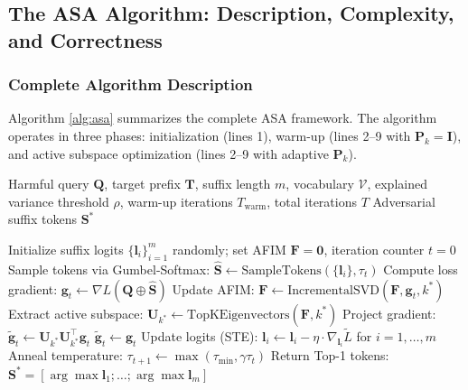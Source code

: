 \documentclass[preprint,12pt]{elsarticle}
\begin{document}
\subsection{The ASA Algorithm: Description, Complexity, and Correctness}
\label{sec:algorithm}

\subsubsection{Complete Algorithm Description}
\label{sec:alg_description}

Algorithm \ref{alg:asa} summarizes the complete ASA framework. The algorithm operates in three phases: initialization (lines 1), warm-up (lines 2--9 with $\mathbf{P}_k = \mathbf{I}$), and active subspace optimization (lines 2--9 with adaptive $\mathbf{P}_k$).

\begin{algorithm}[t]
\caption{Active Subspace Attack (ASA)}
\label{alg:asa}
\begin{algorithmic}[1]
\Require Harmful query $\mathbf{Q}$, target prefix $\mathbf{T}$, suffix length $m$, vocabulary $\mathcal{V}$, explained variance threshold $\rho$, warm-up iterations $T_{\text{warm}}$, total iterations $T$
\Ensure Adversarial suffix tokens $\mathbf{S}^*$

\State Initialize suffix logits $\{\mathbf{l}_i\}_{i=1}^m$ randomly; set AFIM $\mathbf{F} = \mathbf{0}$, iteration counter $t = 0$
{}
    \State Sample tokens via Gumbel-Softmax: $\hat{\mathbf{S}} \leftarrow \text{SampleTokens}(\{\mathbf{l}_i\},\tau_t)$
    \State Compute loss gradient: $\mathbf{g}_t \leftarrow \nabla L(\mathbf{Q} \oplus \hat{\mathbf{S}})$
        \State Update AFIM: $\mathbf{F} \leftarrow \text{IncrementalSVD}(\mathbf{F}, \mathbf{g}_t, k^*)$
        \State Extract active subspace: $\mathbf{U}_{k^*} \leftarrow \text{TopKEigenvectors}(\mathbf{F}, k^*)$
        \State Project gradient: $\tilde{\mathbf{g}}_t \leftarrow \mathbf{U}_{k^*}\mathbf{U}_{k^*}^\top \mathbf{g}_t$
    \Else
        \State $\tilde{\mathbf{g}}_t \leftarrow \mathbf{g}_t$ 
    \EndIf
    \State Update logits (STE): $\mathbf{l}_i \leftarrow \mathbf{l}_i - \eta \cdot \nabla_{\mathbf{l}_i} \tilde{L}$ for $i = 1, \dots, m$
    \State Anneal temperature: $\tau_{t+1} \leftarrow \max(\tau_{\text{min}}, \gamma \tau_t)$
\EndFor
\State Return Top-1 tokens: $\mathbf{S}^* = [\arg\max \mathbf{l}_1; \dots; \arg\max \mathbf{l}_m]$
\end{algorithmic}
\end{algorithm}
\end{document}
